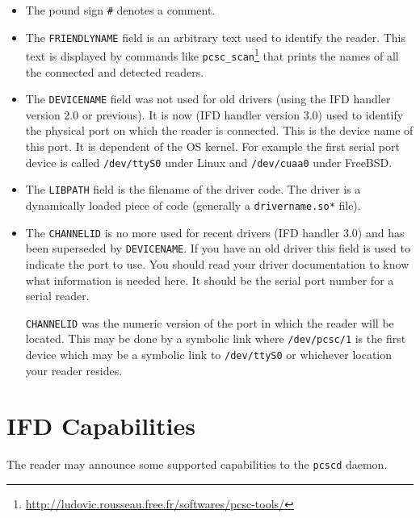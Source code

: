 \documentclass[a4paper,12pt]{article}
\begin{document}
\begin{itemize}
\item The pound sign \verb+#+ denotes a comment.

\item The \texttt{FRIENDLYNAME} field is an arbitrary text used to
identify the reader. This text is displayed by commands like
\texttt{pcsc\_scan}\footnote{\url{http://ludovic.rousseau.free.fr/softwares/pcsc-tools/}}
that prints the names of all the connected and detected readers.

\item The \texttt{DEVICENAME} field was not used for old drivers (using
the IFD handler version 2.0 or previous). It is now (IFD handler version
3.0) used to identify the physical port on which the reader is
connected. This is the device name of this port. It is dependent of the
OS kernel. For example the first serial port device is called
\texttt{/dev/ttyS0} under Linux and \texttt{/dev/cuaa0} under FreeBSD.

\item The \texttt{LIBPATH} field is the filename of the driver code. The
driver is a dynamically loaded piece of code (generally a
\texttt{drivername.so*} file).

\item The \texttt{CHANNELID} is no more used for recent drivers (IFD
handler 3.0) and has been superseded by \texttt{DEVICENAME}. If you
have an old driver this field is used to indicate the port to use. You
should read your driver documentation to know what information is needed
here. It should be the serial port number for a serial reader.

\texttt{CHANNELID} was the numeric version of the port in which the
reader will be located. This may be done by a symbolic link where
\texttt{/dev/pcsc/1} is the first device which may be a symbolic link to
\texttt{/dev/ttyS0} or whichever location your reader resides.

\end{itemize}


\section{IFD Capabilities}

The reader may announce some supported capabilities to the \texttt{pcscd}
daemon.


\end{document}
